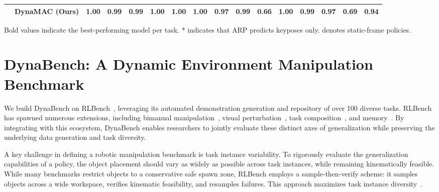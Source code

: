 \documentclass[letterpaper, 10 pt, journal, twoside]{IEEEtran}
\newcommand{\ourmethod}{DynaMAC\xspace}
\newcommand{\ourbench}{DynaBench\xspace}
\begin{document}
\begin{table}
\begin{threeparttable}
\begin{tabular}{ll ccccc cccc cccc c}
            & \textbf{\ourmethod{} (Ours)} & \textbf{1.00} & \textbf{0.99} & \textbf{0.99} & \textbf{1.00} & \textbf{1.00} & \textbf{1.00} & \textbf{0.97} & \textbf{0.99} & \textbf{0.66} & \textbf{1.00} & \textbf{0.99} & \textbf{0.97} & \textbf{0.69} & \textbf{0.94} \\
            \bottomrule
        \end{tabular}
        \begin{tablenotes}
           \footnotesize  
           Bold values indicate the best-performing model per task.
           {*} indicates that ARP predicts keyposes only.
           {\textdagger} denotes static-frame policies.
         \end{tablenotes}
        \end{threeparttable}
        \vspace{-.4cm}
\end{table} 
\section{\ourbench{}: A Dynamic Environment Manipulation Benchmark}\label{sec:bench}
We build \ourbench{} on RLBench~\cite{james2019rlbench}, leveraging its automated demonstration generation and repository of over 100 diverse tasks.
RLBench has spawned numerous extensions, including bimanual manipulation~\cite{grotz2024peract2}, visual perturbation~\cite{pumacay2024colosseum}, task composition~\cite{zheng2022vlmbench}, and memory~\cite{huang2026robostream}.
By integrating with this ecosystem, \ourbench{} enables researchers to jointly evaluate these distinct axes of generalization while preserving the underlying data generation and task diversity.

%
A key challenge in defining a robotic manipulation benchmark is task instance variability.
To rigorously evaluate the generalization capabilities of a policy, the object placement should vary as widely as possible across task instances, while remaining kinematically feasible.
%
%
%
While many benchmarks restrict objects to a conservative safe spawn zone, RLBench employs a sample-then-verify scheme: it samples objects across a wide workspace, verifies kinematic feasibility, and resamples failures.
This approach maximizes task instance diversity~\cite{von2025unreasonable}.
\end{document}

